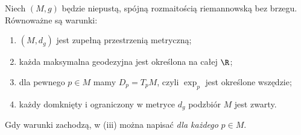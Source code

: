 \begin{twierdzenie}
\label{thm:hopf-rinow-geodezyjne}
Niech $(M,g)$ będzie niepustą, spójną rozmaitością
riemannowską bez brzegu. Równoważne są warunki:
\begin{enumerate}[label=(\roman*)]
\item $(M,d_g)$ jest zupełną przestrzenią metryczną;
\item każda maksymalna geodezyjna jest określona
      na całej $\R$;
\item dla pewnego $p\in M$ mamy $D_p=T_pM$,
      czyli $\exp_p$ jest określone wszędzie;
\item każdy domknięty i ograniczony w metryce
      $d_g$ podzbiór $M$ jest zwarty.
\end{enumerate}
Gdy warunki zachodzą, w (iii) można napisać
\emph{dla każdego} $p\in M$.
\end{twierdzenie}
